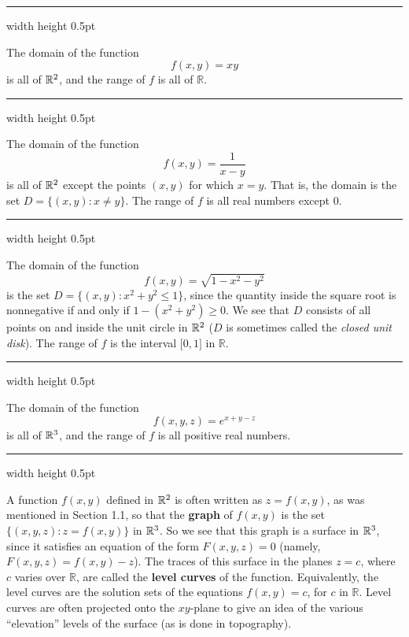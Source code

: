 \vspace{4mm}
\hrule width \textwidth height 0.5pt
\begin{exmp}
 The domain of the function
 \begin{displaymath}
  f(x,y) = xy
 \end{displaymath}
 is all of $\mathbb{R}^{2}$, and the range of $f$ is all of $\mathbb{R}$.
\end{exmp}
\hrule width \textwidth height 0.5pt
\begin{exmp}
 The domain of the function
 \begin{displaymath}
  f(x,y) = \dfrac{1}{x-y}
 \end{displaymath}
 is all of $\mathbb{R}^{2}$ except the points $(x,y)$ for which $x = y$.
 That is, the domain is the set $D = \lbrace (x,y): x \ne y \rbrace$. The range of $f$ is all real numbers except $0$.
\end{exmp}
\hrule width \textwidth height 0.5pt
\begin{exmp}
 The domain of the function
 \begin{displaymath}
  f(x,y) = \sqrt{1 - x^2 - y^2}
 \end{displaymath}
 is the set $D = \lbrace (x,y): x^2 + y^2 \le 1 \rbrace$, since the quantity inside the square root is nonnegative if
 and only if $1 - ( x^2 + y^2 ) \ge 0$. We see that $D$ consists of all points on and inside the unit circle in
 $\mathbb{R}^{2}$ ($D$ is sometimes called the \emph{closed unit disk}). The range of $f$ is the interval
 $\lbrack 0,1 \rbrack$ in $\mathbb{R}$.
\end{exmp}
\hrule width \textwidth height 0.5pt
\newpage
\begin{exmp}
 The domain of the function
 \begin{displaymath}
  f(x,y,z) = e^{x + y - z}
 \end{displaymath}
 is all of $\mathbb{R}^{3}$, and the range of $f$ is all positive real numbers.
\end{exmp}
\hrule width \textwidth height 0.5pt
\vspace{4mm}

A function $f(x,y)$ defined in $\mathbb{R}^{2}$ is often written as $z = f(x,y)$, as was mentioned in Section 1.1,
so that the \textbf{graph} of $f(x,y)$ is the set $\lbrace (x,y,z): z = f(x,y) \rbrace$ in $\mathbb{R}^{3}$. So we
see that this graph is a surface in $\mathbb{R}^{3}$, since it satisfies an equation of the form $F(x,y,z) = 0$ 
(namely, $F(x,y,z) = f(x,y) - z$). The traces of this surface in the planes $z  = c$, where $c$ varies over
$\mathbb{R}$, are called the \textbf{level curves} of the function. Equivalently, the level
curves are the solution
sets of the equations $f(x,y) = c$, for $c$ in $\mathbb{R}$. Level curves are often projected onto the $xy$-plane
to give an idea of the various ``elevation'' levels of the surface (as is done in topography).

